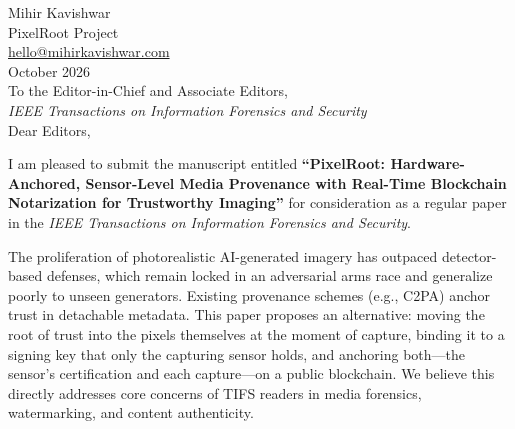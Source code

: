 \documentclass[11pt]{article}
\begin{document}
\noindent Mihir Kavishwar\\
PixelRoot Project\\
\href{mailto:hello@mihirkavishwar.com}{hello@mihirkavishwar.com}\\[1em]

\noindent October 2026\\[1em]

\noindent To the Editor-in-Chief and Associate Editors,\\
\textit{IEEE Transactions on Information Forensics and Security}\\[1em]

\noindent Dear Editors,

I am pleased to submit the manuscript entitled \textbf{``PixelRoot:
Hardware-Anchored, Sensor-Level Media Provenance with Real-Time Blockchain
Notarization for Trustworthy Imaging''} for consideration as a regular paper in
the \textit{IEEE Transactions on Information Forensics and Security}.

The proliferation of photorealistic AI-generated imagery has outpaced
detector-based defenses, which remain locked in an adversarial arms race and
generalize poorly to unseen generators. Existing provenance schemes (e.g.,
C2PA) anchor trust in detachable metadata. This paper proposes an alternative:
moving the root of trust into the pixels themselves at the moment of capture,
binding it to a signing key that only the capturing sensor holds, and anchoring
both---the sensor's certification and each capture---on a public blockchain. We
believe this directly addresses core concerns of TIFS readers in media
forensics, watermarking, and content authenticity.
\end{document}
